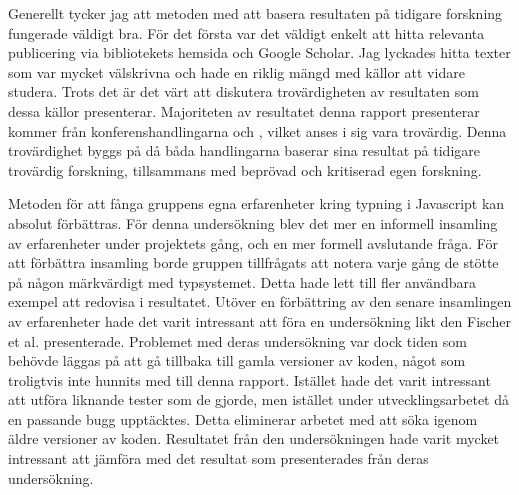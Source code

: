 Generellt tycker jag att metoden med att basera resultaten på tidigare forskning fungerade väldigt bra. För det första var det väldigt enkelt att hitta relevanta publicering via bibliotekets hemsida och Google Scholar. Jag lyckades hitta texter som var mycket välskrivna och hade en riklig mängd med källor att vidare studera. Trots det är det värt att diskutera trovärdigheten av resultaten som dessa källor presenterar. Majoriteten av resultatet denna rapport presenterar kommer från konferenshandlingarna \cite{Fischer:2015:EIE:2816707.2816720} och \cite{type-or-not-proceed}, vilket anses i sig vara trovärdig. Denna trovärdighet byggs på då båda handlingarna baserar sina resultat på tidigare trovärdig forskning, tillsammans med beprövad och kritiserad egen forskning. 

Metoden för att fånga gruppens egna erfarenheter kring typning i Javascript kan absolut förbättras. För denna undersökning blev det mer en informell insamling av erfarenheter under projektets gång, och en mer formell avslutande fråga. För att förbättra insamling borde gruppen tillfrågats att notera varje gång de stötte på någon märkvärdigt med typsystemet. Detta hade lett till fler användbara exempel att redovisa i resultatet. Utöver en förbättring av den senare insamlingen av erfarenheter hade det varit intressant att föra en undersökning likt den Fischer et al. presenterade. Problemet med deras undersökning var dock tiden som behövde läggas på att gå tillbaka till gamla versioner av koden, något som troligtvis inte hunnits med till denna rapport. Istället hade det varit intressant att utföra liknande tester som de gjorde, men istället under utvecklingsarbetet då en passande bugg upptäcktes. Detta eliminerar arbetet med att söka igenom äldre versioner av koden. Resultatet från den undersökningen hade varit mycket intressant att jämföra med det resultat som presenterades från deras undersökning.


\pagebreak